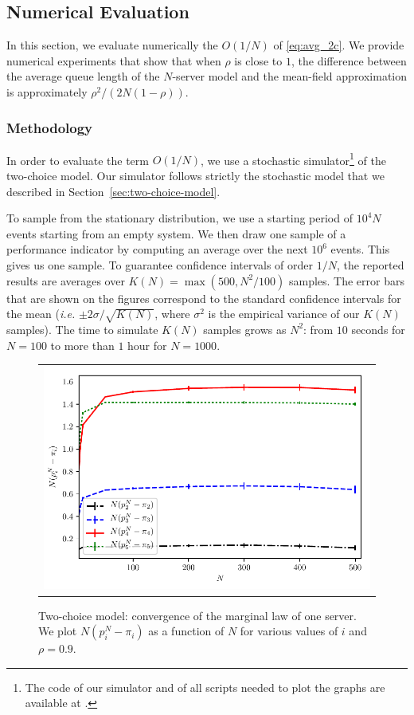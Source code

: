 \documentclass[acmlarge]{acmart}
\begin{document}
\subsection{Numerical Evaluation}

In this section, we evaluate numerically the $O(1/N)$ of
\eqref{eq:avg_2c}. We provide numerical experiments that show that
when $\rho$ is close to $1$, the difference between the average queue
length of the $N$-server model and the mean-field approximation is
approximately $\rho^2/(2N(1-\rho))$.

\subsubsection{Methodology}

In order to evaluate the term $O(1/N)$, we use a stochastic
simulator\footnote{The code of our simulator and of all scripts needed
  to plot the graphs are available at \githublink.} of the two-choice
model. Our simulator follows strictly the stochastic model that we
described in Section~\ref{sec:two-choice-model}.

To sample from the stationary distribution, we use a starting period
of $10^4N$ events starting from an empty system. We then draw one
sample of a performance indicator by computing an average over the
next $10^6$ events. This gives us one sample. To guarantee confidence
intervals of order $1/N$, the reported results are averages over
$K(N)=\max(500,N^2/100)$ samples. The error bars that are shown on the
figures correspond to the standard confidence intervals for the mean
(\emph{i.e.} $\pm2\sigma/\sqrt{K(N)}$, where $\sigma^2$ is the
empirical variance of our $K(N)$ samples).  The time to simulate
$K(N)$ samples grows as $N^2$: from $10$ seconds for $N=100$ to more
than $1$ hour for $N=1000$.



\begin{figure}[t]
  \centering
  \begin{tabular}{@{}c@{}}
    \includegraphics[width=0.90\linewidth]{2choice_convergence_rho90}\\
  \end{tabular}
  \caption{Two-choice model: convergence of the marginal law of one
    server. We plot $N(p^N_i-\pi_i)$ as a function of $N$ for various
    values of $i$ and $\rho=0.9$. }
  \label{fig:2-choice_x}
\end{figure}
\end{document}
